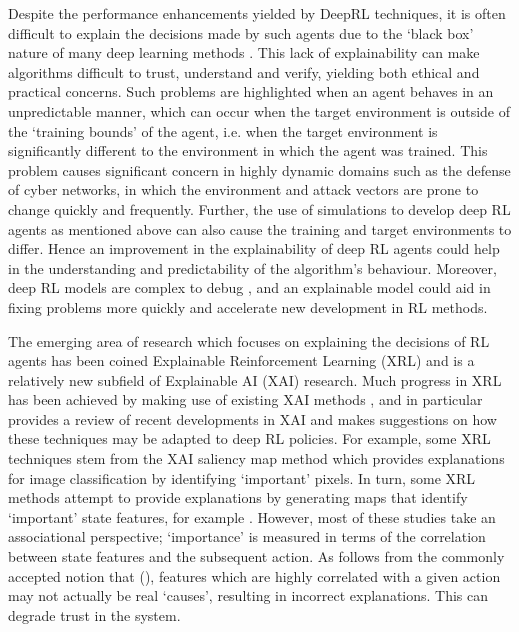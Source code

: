 \documentclass{article}
\begin{document}
Despite the performance enhancements yielded by DeepRL techniques, it is often difficult to explain the decisions made by such agents due to the `black box' nature of many deep learning methods \cite{PearlMackenzie18}. This lack of explainability can make algorithms difficult to trust, understand and verify, yielding both ethical and practical concerns. Such problems are highlighted when an agent behaves in an unpredictable manner, which can occur when the target environment is outside of the `training bounds' of the agent, i.e. when the target environment is significantly different to the environment in which the agent was trained. This problem causes significant concern in highly dynamic domains such as the defense of cyber networks, in which the environment and attack vectors are prone to change quickly and frequently. Further, the use of simulations to develop deep RL agents as mentioned above can also cause the training and target environments to differ. Hence an improvement in the explainability of deep RL agents could help in the understanding and predictability of the algorithm's behaviour. Moreover, deep RL models are complex to debug \cite{heuillet2021explainability}, and an explainable model could aid in fixing problems more quickly and accelerate new development in RL methods. 

The emerging area of research which focuses on explaining the decisions of RL agents has been coined Explainable Reinforcement Learning (XRL) and is a relatively new subfield of Explainable AI (XAI) research. Much progress in XRL has been achieved by making use of existing XAI methods \cite{wang2022causal}, and in particular \cite{heuillet2021explainability} provides a review of recent developments in XAI and makes suggestions on how these techniques may be adapted to deep RL policies. For example, some XRL techniques stem from the XAI saliency map method \cite{simonyan2013deep} which provides explanations for image classification by identifying `important' pixels. In turn, some XRL methods attempt to provide explanations by generating maps that identify `important' state features, for example \cite{greydanus2018visualizing}. However, most of these studies take an associational perspective; `importance' is measured in terms of the correlation between state features and the subsequent action. As follows from the commonly accepted notion that  (\cite{PearlMackenzie18}), features which are highly correlated with a given action may not actually be real `causes', resulting in incorrect explanations. This can degrade trust in the system.
\end{document}
